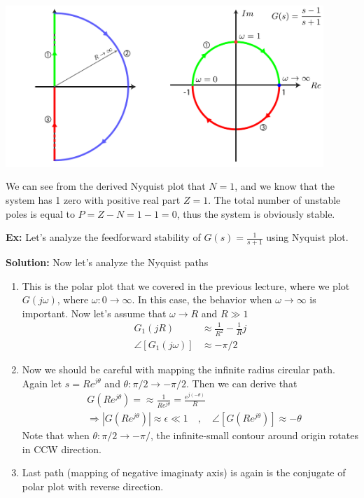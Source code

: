 \documentclass[twoside]{article}
\begin{document}
  \begin{minipage}[h]{1\linewidth}
    \begin{center}
      \includegraphics[width=0.9\textwidth]{ex1}
    \end{center}
  \end{minipage}

\vspace{6 pt}

We can see from the derived Nyquist plot that $N=1$, and 
we know that the system has 1 zero with positive real part 
$Z =1$. The total number of unstable poles is equal to
$P = Z - N = 1 - 1 = 0$, thus the system is obviously stable. 

\newpage

\textbf{Ex:} Let's analyze the feedforward stability of $G(s) =
\frac{1}{s+1}$ using Nyquist plot. 

\textbf{Solution:} Now let's analyze the Nyquist paths
%
\begin{enumerate}
  \item This is the polar plot that we covered in the previous
    lecture, where we plot $G(j \omega)$, where $\omega : 0 \to
    \infty$. In this case, the behavior when $\omega \to \infty$ is
    important. Now let's assume that $\omega \to R$ and $R \gg 1$
  \begin{align*}
   G_1(j R) &\approx \frac{1}{R^2} - \frac{1}{R} j
    \\
    \angle [ G_1(j \omega) ] &\approx -\pi / 2
   \end{align*}
%
  \item Now we should be careful with mapping the infinite radius
    circular path. Again let $s = R e^{j \theta}$ and $\theta : \pi/2
    \to -\pi/2$.  Then 
   we can derive that  
   \begin{align*}
     & G \left( R e^{j \theta} \right) = \approx \frac{1}{R e^{j
       \theta}} = \frac{e^{j (-\theta)}}{R}
       \\
    &\Rightarrow | G \left( R e^{j \theta} \right) | \approx \epsilon
      \ll 1
   \quad , \quad \angle [ G \left( R e^{j \theta} \right) ] \approx -\theta
   \end{align*}
   Note that when $\theta : \pi/2 \to -\pi/$, the infinite-small 
   contour around origin rotates in CCW direction. 
   \item Last path (mapping of negative imaginaty axis) is again
   is the conjugate of polar plot with reverse direction. 
\end{enumerate}
\end{document}
